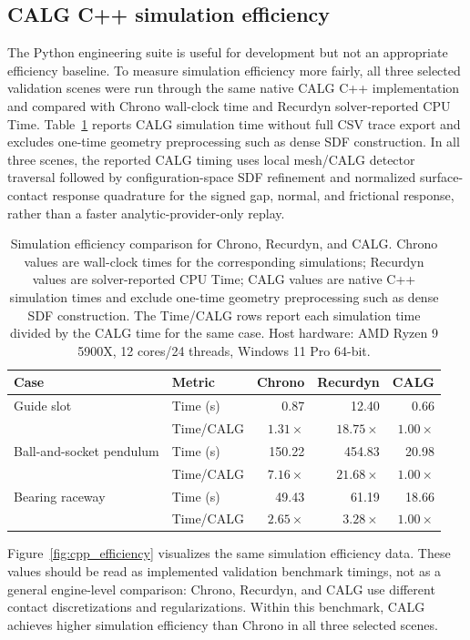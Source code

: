 \documentclass[preprint,12pt]{elsarticle}
\begin{document}
\subsection{CALG C++ simulation efficiency}

The Python engineering suite is useful for development but not an appropriate efficiency baseline. To measure simulation efficiency more fairly, all three selected validation scenes were run through the same native CALG C++ implementation and compared with Chrono wall-clock time and Recurdyn solver-reported CPU Time. Table~\ref{tab:cpp_efficiency} reports CALG simulation time without full CSV trace export and excludes one-time geometry preprocessing such as dense SDF construction. In all three scenes, the reported CALG timing uses local mesh/CALG detector traversal followed by configuration-space SDF refinement and normalized surface-contact response quadrature for the signed gap, normal, and frictional response, rather than a faster analytic-provider-only replay.

\begin{table}[t]
\centering
\caption{Simulation efficiency comparison for Chrono, Recurdyn, and CALG. Chrono values are wall-clock times for the corresponding simulations; Recurdyn values are solver-reported CPU Time; CALG values are native C++ simulation times and exclude one-time geometry preprocessing such as dense SDF construction. The Time/CALG rows report each simulation time divided by the CALG time for the same case. Host hardware: AMD Ryzen 9 5900X, 12 cores/24 threads, Windows 11 Pro 64-bit.}
\label{tab:cpp_efficiency}
\begin{tabular}{l l r r r}
\toprule
Case & Metric & Chrono & Recurdyn & CALG \\
\midrule
Guide slot & Time (s) & 0.87 & 12.40 & 0.66 \\
& Time/CALG & $1.31\times$ & $18.75\times$ & $1.00\times$ \\
\midrule
Ball-and-socket pendulum & Time (s) & 150.22 & 454.83 & 20.98 \\
& Time/CALG & $7.16\times$ & $21.68\times$ & $1.00\times$ \\
\midrule
Bearing raceway & Time (s) & 49.43 & 61.19 & 18.66 \\
& Time/CALG & $2.65\times$ & $3.28\times$ & $1.00\times$ \\
\bottomrule
\end{tabular}
\end{table}

Figure~\ref{fig:cpp_efficiency} visualizes the same simulation efficiency data. These values should be read as implemented validation benchmark timings, not as a general engine-level comparison: Chrono, Recurdyn, and CALG use different contact discretizations and regularizations. Within this benchmark, CALG achieves higher simulation efficiency than Chrono in all three selected scenes.
\end{document}
